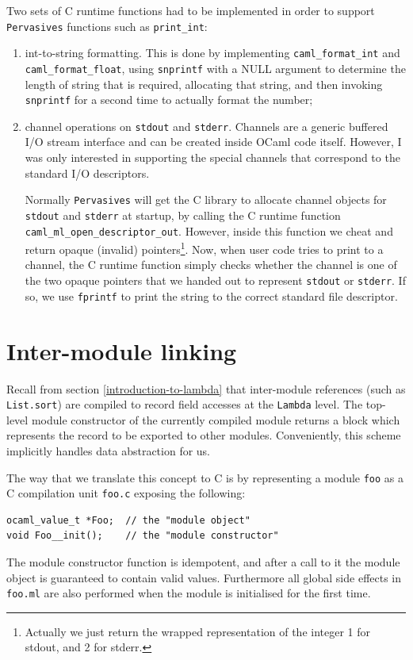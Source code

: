 \documentclass[12pt,a4paper,twoside,openright]{report}
\newcommand{\lc}{\lstset{language=C,morekeywords={}}}
\newcommand{\lnone}{\lstset{language={},morekeywords={}}}
\begin{document}
Two sets of C runtime functions had to be implemented in order to support
\lstinline!Pervasives! functions such as \lstinline!print_int!:
\begin{enumerate}
  \item int-to-string formatting. This is done by implementing
    \lstinline!caml_format_int! and \lstinline!caml_format_float!, using
    \lstinline!snprintf! with a NULL argument to determine the length of string
    that is required, allocating that string, and then invoking
    \lstinline!snprintf! for a second time to actually format the number;
  \item channel operations on \lstinline!stdout! and \lstinline!stderr!.
    Channels are a generic buffered I/O stream interface and can be created
    inside OCaml code itself. However, I was only interested in supporting the
    special channels that correspond to the standard I/O descriptors.

    Normally \lstinline!Pervasives! will get the C library to allocate channel
    objects for \lstinline!stdout! and \lstinline!stderr! at startup, by calling the C runtime function
    \lstinline!caml_ml_open_descriptor_out!. However,
    inside this function we cheat and return opaque (invalid)
    pointers\footnote{Actually we just return the wrapped representation of the integer 1
    for stdout, and 2 for stderr.}. Now, when user code tries to
    print to a channel, the C runtime function simply checks whether the channel is
    one of the two opaque pointers that we handed out to represent
    \lstinline!stdout! or \lstinline!stderr!. If so, we use \lstinline!fprintf!
    to print the string to the correct standard file descriptor.
\end{enumerate}

\section{Inter-module linking}

Recall from section \ref{introduction-to-lambda} that inter-module references
(such as \lstinline!List.sort!) are compiled to record field accesses at the
\lstinline!Lambda! level. The top-level module constructor of the currently
compiled module returns a block which represents the record to be exported to
other modules. Conveniently, this scheme implicitly handles data abstraction
for us.

The way that we translate this concept to C is by representing a module
\lstinline!foo! as a C compilation unit \lstinline!foo.c! exposing the following:
\lc\begin{lstlisting}
ocaml_value_t *Foo;  // the "module object"
void Foo__init();    // the "module constructor"
\end{lstlisting}\lnone
The module
constructor function is idempotent, and after a call to it the module object is
guaranteed to contain valid values. Furthermore all global side effects in
\lstinline!foo.ml! are also performed when the module is initialised for the
first time.
\end{document}
